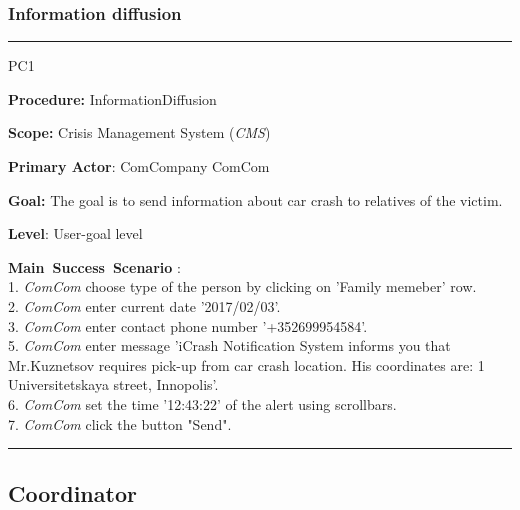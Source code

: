 \subsubsection{Information diffusion}
\vspace{0.5cm}
\hrule
\begin{lyxlist}{PC1}
\small{
\item [\textbf{Procedure:}] InformationDiffusion
\item [\textbf{Scope:}]  Crisis Management System (\emph{CMS})
\item [\textbf{Primary Actor}:] ComCompany ComCom
\item [\textbf{Goal:}] The goal is to send information about car crash to
relatives of the victim.
\item [\textbf{Level}:] User-goal level
\item [\textbf{Main~Success~Scenario}]:\\
1. \emph{ComCom} choose type of the person by clicking on 'Family memeber' row.
\\
2. \emph{ComCom} enter current date '2017/02/03'. \\
3. \emph{ComCom} enter contact phone number '+352699954584'. \\
5. \emph{ComCom} enter message 'iCrash Notification System informs you that
Mr.Kuznetsov requires pick-up from car crash location. His coordinates are:
1 Universitetskaya street, Innopolis'.\\
6. \emph{ComCom} set the time '12:43:22' of the alert using scrollbars.\\
7. \emph{ComCom} click the button "Send".\\
}
\end{lyxlist}
\hrule
\vspace{0.5cm}

\subsection{Coordinator}

